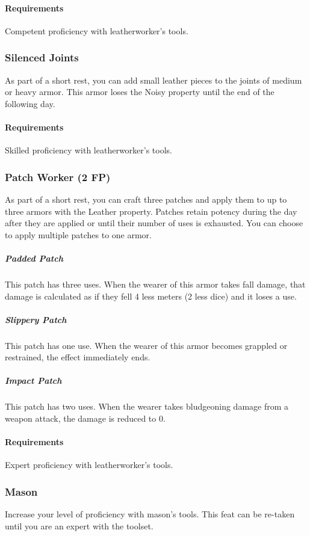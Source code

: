     \paragraph{Requirements} Competent proficiency with leatherworker's tools.
\subsubsection{Silenced Joints} \label{feat::silencedjoints}
    As part of a short rest, you can add small leather pieces to the joints of medium or heavy armor.
    This armor loses the Noisy property until the end of the following day.
    \paragraph{Requirements} Skilled proficiency with leatherworker's tools.
\subsubsection{Patch Worker (2 FP)} \label{feat::patchworker}
    As part of a short rest, you can craft three patches and apply them to up to three armors with the Leather property.
    Patches retain potency during the day after they are applied or until their number of uses is exhausted.
    You can choose to apply multiple patches to one armor.
    \subparagraph{Padded Patch} This patch has three uses.
    When the wearer of this armor takes fall damage, that damage is calculated as if they fell 4 less meters (2 less dice) and it loses a use.
    \subparagraph{Slippery Patch} This patch has one use.
    When the wearer of this armor becomes grappled or restrained, the effect immediately ends.
    \subparagraph{Impact Patch} This patch has two uses.
    When the wearer takes bludgeoning damage from a weapon attack, the damage is reduced to 0.
    \paragraph{Requirements} Expert proficiency with leatherworker's tools.

\subsubsection{Mason} \label{feat::mason}
    Increase your level of proficiency with mason's tools.
    This feat can be re-taken until you are an expert with the toolset.

